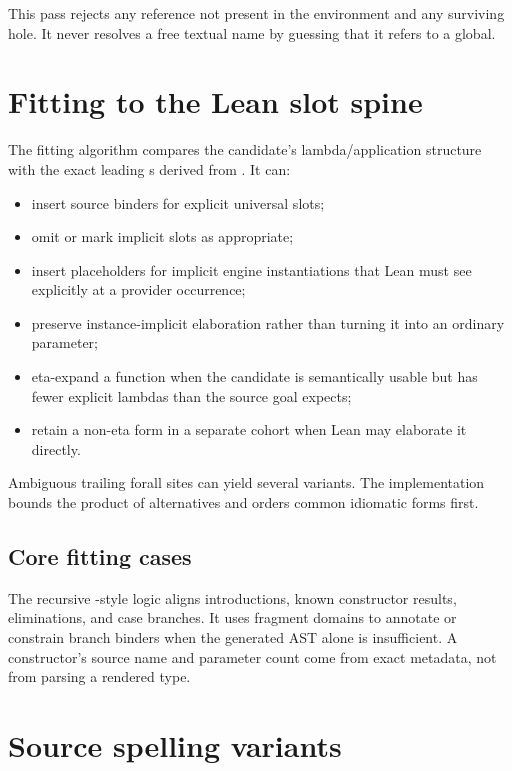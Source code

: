\documentclass[10pt,letterpaper,oneside]{report}
\newcommand{\code}[1]{\texttt{\detokenize{#1}}}
\begin{document}
This pass rejects any reference not present in the environment and any surviving hole. It never resolves a free textual name by guessing that it refers to a global.

\section{Fitting to the Lean slot spine}\label{sec:fit-slots}

The fitting algorithm compares the candidate's lambda/application structure with the exact leading \code{Slot}s derived from \code{Frag}. It can:

\begin{itemize}
  \item insert source binders for explicit universal slots;
  \item omit or mark implicit slots as appropriate;
  \item insert \code{_} placeholders for implicit engine instantiations that Lean must see explicitly at a provider occurrence;
  \item preserve instance-implicit elaboration rather than turning it into an ordinary parameter;
  \item eta-expand a function when the candidate is semantically usable but has fewer explicit lambdas than the source goal expects;
  \item retain a non-eta form in a separate cohort when Lean may elaborate it directly.
\end{itemize}

Ambiguous trailing forall sites can yield several variants. The implementation bounds the product of alternatives and orders common idiomatic forms first.

\subsection{Core fitting cases}

The recursive \code{fitCore}-style logic aligns introductions, known constructor results, eliminations, and case branches. It uses fragment domains to annotate or constrain branch binders when the generated AST alone is insufficient. A constructor's source name and parameter count come from exact metadata, not from parsing a rendered type.

\section{Source spelling variants}
\end{document}
